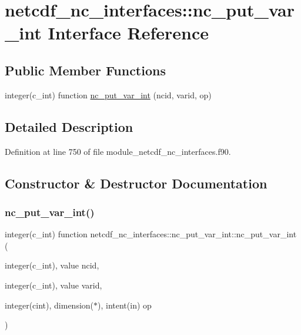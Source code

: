 \hypertarget{interfacenetcdf__nc__interfaces_1_1nc__put__var__int}{}\section{netcdf\+\_\+nc\+\_\+interfaces\+:\+:nc\+\_\+put\+\_\+var\+\_\+int Interface Reference}
\label{interfacenetcdf__nc__interfaces_1_1nc__put__var__int}
\subsection*{Public Member Functions}
\begin{DoxyCompactItemize}
\item 
integer(c\+\_\+int) function \hyperlink{interfacenetcdf__nc__interfaces_1_1nc__put__var__int_acb063a54be3f7a4de9f0d51574d3a98d}{nc\+\_\+put\+\_\+var\+\_\+int} (ncid, varid, op)
\end{DoxyCompactItemize}


\subsection{Detailed Description}


Definition at line 750 of file module\+\_\+netcdf\+\_\+nc\+\_\+interfaces.\+f90.



\subsection{Constructor \& Destructor Documentation}
\mbox{\label{interfacenetcdf__nc__interfaces_1_1nc__put__var__int_acb063a54be3f7a4de9f0d51574d3a98d}} 
\subsubsection{\texorpdfstring{nc\+\_\+put\+\_\+var\+\_\+int()}{nc\_put\_var\_int()}}
{\footnotesize\ttfamily integer(c\+\_\+int) function netcdf\+\_\+nc\+\_\+interfaces\+::nc\+\_\+put\+\_\+var\+\_\+int\+::nc\+\_\+put\+\_\+var\+\_\+int (\begin{DoxyParamCaption}\item[{integer(c\+\_\+int), value}]{ncid,  }\item[{integer(c\+\_\+int), value}]{varid,  }\item[{integer(cint), dimension($\ast$), intent(in)}]{op }\end{DoxyParamCaption})}



